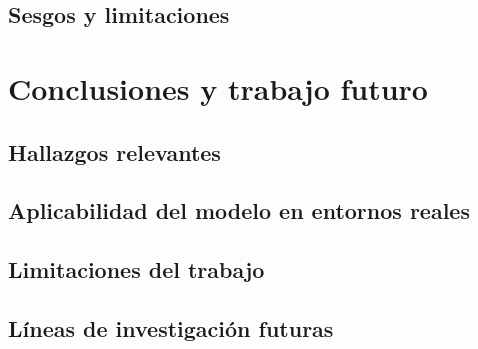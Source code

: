 \documentclass[12pt]{article}
\begin{document}
	
	\subsection{Sesgos y limitaciones}

\newpage
\section{\label{trabajo futuro}Conclusiones y trabajo futuro}

	\subsection{Hallazgos relevantes}
	
	\subsection{Aplicabilidad del modelo en entornos reales}
	
	\subsection{Limitaciones del trabajo}
	
	\subsection{Líneas de investigación futuras}

\newpage



\newpage
\end{document}
